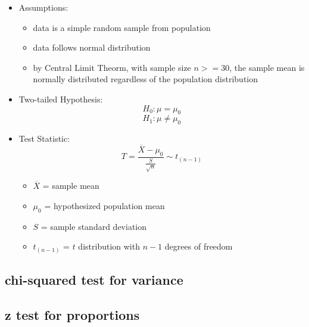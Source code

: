 \documentclass[]{book}
\providecommand{\tightlist}{%
  \setlength{\itemsep}{0pt}\setlength{\parskip}{0pt}}
\begin{document}
\begin{itemize}
\item
  Assumptions:

  \begin{itemize}
  \tightlist
  \item
    data is a simple random sample from population
  \item
    data follows normal distribution
  \item
    by Central Limit Theorm, with sample size \(n>=30\), the sample mean is normally distributed regardless of the population distribution
  \end{itemize}
\item
  Two-tailed Hypothesis:
  \[ H_0: \mu = \mu_0 \]
  \[ H_1: \mu \neq \mu_0 \]
\item
  Test Statistic:
  \[ T = \frac{\overline{X}-\mu_0}{\frac{S}{\sqrt{n}}} \sim t_{(n-1)} \]

  \begin{itemize}
  \tightlist
  \item
    \(\overline{X}\) = sample mean
  \item
    \(\mu_0\) = hypothesized population mean
  \item
    \(S\) = sample standard deviation
  \item
    \(t_{(n-1)}\) = \(t\) distribution with \(n-1\) degrees of freedom
  \end{itemize}
\end{itemize}

\hypertarget{chi-squared-test-for-variance}{%
\subsection{chi-squared test for variance}\label{chi-squared-test-for-variance}}

\hypertarget{z-test-for-proportions}{%
\subsection{z test for proportions}\label{z-test-for-proportions}}
\end{document}
